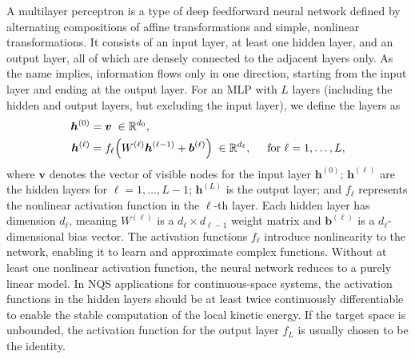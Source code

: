 A multilayer perceptron is a type of deep feedforward neural network defined by alternating compositions of affine transformations and simple, nonlinear transformations. It consists of an input layer, at least one hidden layer, and an output layer, all of which are densely connected to the adjacent layers only. As the name implies, information flows only in one direction, starting from the input layer and ending at the output layer. For an MLP with $L$ layers (including the hidden and output layers, but excluding the input layer), we define the layers as 
\begin{align}
    \boldsymbol{h}^{(0)} &= \boldsymbol{v} \;\in \mathbb{R}^{d_0},\\
    \boldsymbol{h}^{(\ell)} &= f_\ell \!\left( W^{(\ell)} \boldsymbol{h}^{(\ell-1)} + \boldsymbol{b}^{(\ell)} \right) \; \in \mathbb{R}^{d_\ell}, 
    \hspace{5mm}
    \mathrm{for} \ \ell = 1, \dots, L,
\label{eq:forward-prop}
\end{align}
where $\boldsymbol{v}$ denotes the vector of visible nodes for the input layer $\boldsymbol{h}^{(0)}$; 
$\boldsymbol{h}^{(\ell)}$ are the hidden layers for $\ell = 1, \dots, L-1$; 
$\boldsymbol{h}^{(L)}$ is the output layer; and $f_\ell$ represents the nonlinear activation function in the $\ell$-th layer.
Each hidden layer has dimension $d_\ell$, meaning $W^{(\ell)}$ is a $d_\ell \times d_{\ell-1}$ weight matrix and $\boldsymbol{b}^{(\ell)}$ is a $d_\ell$-dimensional bias vector. 
The activation functions $f_\ell$ introduce nonlinearity to the network, enabling it to learn and approximate complex functions. 
Without at least one nonlinear activation function, the neural network reduces to a purely linear model. 
In NQS applications for continuous-space systems, the activation functions in the hidden layers should be at least twice continuously differentiable to enable the stable computation of the local kinetic energy. 
If the target space is unbounded, the activation function for the output layer $f_L$ is usually chosen to be the identity.

